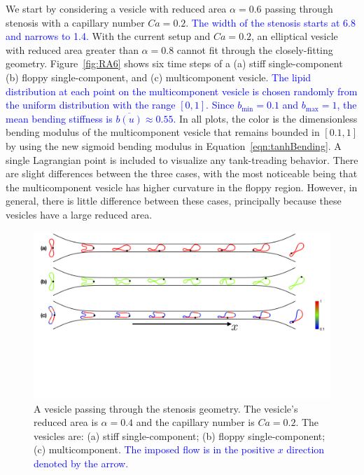 \documentclass[twoside,twocolumn,9pt]{article}
\begin{document}
We start by considering a vesicle with reduced area $\alpha = 0.6$
passing through stenosis with a capillary number $Ca = 0.2$. 
\textcolor{blue}{
The width of the stenosis starts at $6.8$
and narrows to 1.4.
}
With the current setup and $Ca = 0.2$, an elliptical vesicle with reduced
area greater than $\alpha = 0.8$ cannot fit through the closely-fitting
geometry. Figure~\ref{fig:RA6} shows six time steps of a (a) stiff
single-component (b) floppy single-component, and (c) multicomponent
vesicle. 
\textcolor{blue}{
The lipid distribution at each point on the multicomponent vesicle is
chosen randomly from the uniform distribution with the range $[0,1]$.
Since $b_{\min}=0.1$ and $b_{\max}=1$, the mean bending stiffness is
$\overline{b(u)} \approx 0.55$.}
In all plots, the color is the dimensionless bending modulus of the
multicomponent vesicle that remains bounded in $[0.1,1]$ by using the
new sigmoid bending modulus in Equation~\eqref{eqn:tanhBending}. A
single Lagrangian point is included to visualize any tank-treading
behavior. There are slight differences between the three cases, with the
most noticeable being that the multicomponent vesicle has higher
curvature in the floppy region. However, in general, there is little
difference between these cases, principally because these vesicles have
a large reduced area. 

\begin{figure}[h]
  \centering
  \includegraphics[width=0.9\linewidth]{figures/STENOSIS_RAp4MCp5.pdf}
  \caption{\label{fig:RA4} \small A vesicle passing through the stenosis
  geometry. The vesicle's reduced area is $\alpha = 0.4$ and the
  capillary number is $Ca = 0.2$. The vesicles are: (a) stiff
  single-component; (b) floppy single-component; (c) multicomponent.
  \textcolor{blue}{The imposed flow is in the positive $x$ direction
  denoted by the arrow.}}
\end{figure}
\end{document}
